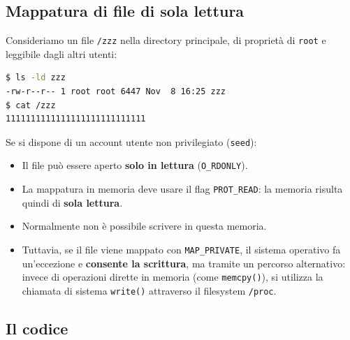 \documentclass{article}
\begin{document}
\subsection*{Mappatura di file di sola lettura}


Consideriamo un file \texttt{/zzz} nella directory principale, di proprietà di \texttt{root} e leggibile dagli altri utenti:

\begin{lstlisting}[language=bash]
$ ls -ld zzz
-rw-r--r-- 1 root root 6447 Nov  8 16:25 zzz
$ cat /zzz
1111111111111111111111111111
\end{lstlisting}

Se si dispone di un account utente non privilegiato (\texttt{seed}):
\begin{itemize}
    \item Il file può essere aperto \textbf{solo in lettura} (\texttt{O\_RDONLY}).
    \item La mappatura in memoria deve usare il flag \texttt{PROT\_READ}: la memoria risulta quindi di \textbf{sola lettura}.
    \item Normalmente non è possibile scrivere in questa memoria.
    \item Tuttavia, se il file viene mappato con \texttt{MAP\_PRIVATE}, il sistema operativo fa un'eccezione e \textbf{consente la scrittura}, ma tramite un percorso alternativo: invece di operazioni dirette in memoria (come \texttt{memcpy()}), si utilizza la chiamata di sistema \texttt{write()} attraverso il filesystem \texttt{/proc}.
\end{itemize}

\subsection*{Il codice}
\end{document}
